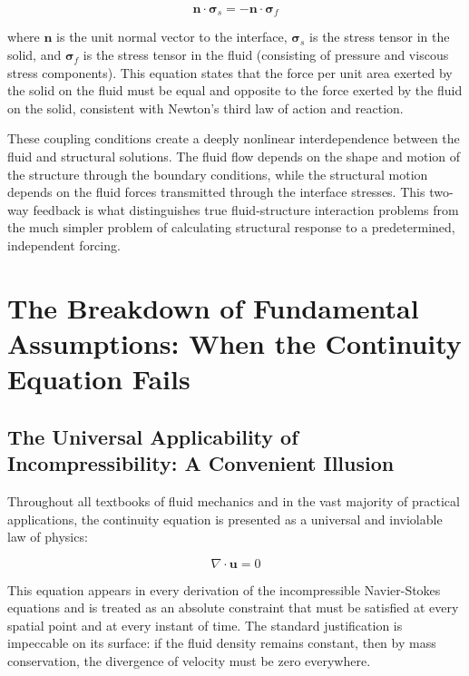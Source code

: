﻿\documentclass[a4paper,11pt]{article}
\theoremstyle{definition}
\begin{document}
\begin{equation}
\mathbf{n} \cdot \boldsymbol{\sigma}_s = -\mathbf{n} \cdot \boldsymbol{\sigma}_f
\label{eq:traction_coupling}
\end{equation}

where $\mathbf{n}$ is the unit normal vector to the interface, $\boldsymbol{\sigma}_s$ is the stress tensor in the solid, and $\boldsymbol{\sigma}_f$ is the stress tensor in the fluid (consisting of pressure and viscous stress components). This equation states that the force per unit area exerted by the solid on the fluid must be equal and opposite to the force exerted by the fluid on the solid, consistent with Newton's third law of action and reaction.

These coupling conditions create a deeply nonlinear interdependence between the fluid and structural solutions. The fluid flow depends on the shape and motion of the structure through the boundary conditions, while the structural motion depends on the fluid forces transmitted through the interface stresses. This two-way feedback is what distinguishes true fluid-structure interaction problems from the much simpler problem of calculating structural response to a predetermined, independent forcing.

\section{The Breakdown of Fundamental Assumptions: When the Continuity Equation Fails}

\subsection{The Universal Applicability of Incompressibility: A Convenient Illusion}

Throughout all textbooks of fluid mechanics and in the vast majority of practical applications, the continuity equation is presented as a universal and inviolable law of physics:

\begin{equation}
\nabla \cdot \mathbf{u} = 0
\end{equation}

This equation appears in every derivation of the incompressible Navier-Stokes equations and is treated as an absolute constraint that must be satisfied at every spatial point and at every instant of time. The standard justification is impeccable on its surface: if the fluid density remains constant, then by mass conservation, the divergence of velocity must be zero everywhere.
\end{document}
